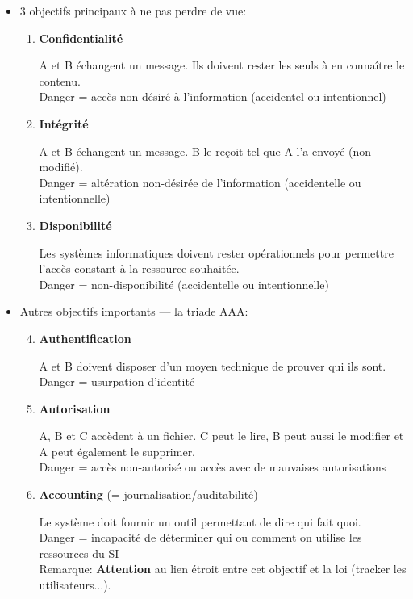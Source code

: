 \documentclass[a4paper]{article}
\begin{document}
\begin{itemize}
\item 3 objectifs principaux à ne pas perdre de vue:
\begin{enumerate}
    \item \textbf{Confidentialité}
    \begin{example}
        A et B échangent un message. Ils doivent rester les seuls à en connaître le contenu. \\
        Danger = accès non-désiré à l'information (accidentel ou intentionnel)
    \end{example}
    \item \textbf{Intégrité}
    \begin{example}
        A et B échangent un message. B le reçoit tel que A l'a envoyé (non-modifié). \\
        Danger = altération non-désirée de l'information (accidentelle ou intentionnelle)
    \end{example}
    \item \textbf{Disponibilité}
    \begin{example}
        Les systèmes informatiques doivent rester opérationnels pour permettre l'accès constant à la ressource souhaitée. \\
        Danger = non-disponibilité (accidentelle ou intentionnelle)
    \end{example}
\end{enumerate}





\item Autres objectifs importants --- la triade AAA:
\begin{enumerate} \setcounter{enumi}{3}
    \item \textbf{Authentification}
    \begin{example}
        A et B doivent disposer d’un moyen technique de prouver qui ils sont. \\
        Danger = usurpation d’identité
    \end{example}
    \item \textbf{Autorisation}
    \begin{example}
        A, B et C accèdent à un fichier. C peut le lire, B peut aussi le modifier et A peut également le supprimer. \\
        Danger = accès non-autorisé ou accès avec de mauvaises autorisations
    \end{example}
    \item \textbf{Accounting} (= journalisation/auditabilité)
    \begin{example}
        Le système doit fournir un outil permettant de dire qui fait quoi. \\
        Danger = incapacité de déterminer qui ou comment on utilise les ressources du SI \\
        Remarque: \textbf{Attention} au lien étroit entre cet objectif et la loi (tracker les utilisateurs...).
    \end{example}
\end{enumerate}






\end{itemize}
\end{document}
